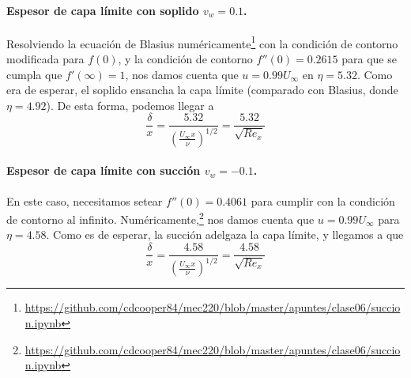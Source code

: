 \paragraph*{Espesor de capa límite con soplido $v_w=0.1$.}
Resolviendo la ecuación de Blasius numéricamente\footnote{\url{https://github.com/cdcooper84/mec220/blob/master/apuntes/clase06/succion.ipynb}} con la condición de contorno modificada para $f(0)$, y la condición de contorno $f''(0)=0.2615$ para que se cumpla que $f'(\infty)=1$, nos damos cuenta que $u=0.99U_\infty$ en $\eta=5.32$. 
Como era de esperar, el soplido ensancha la capa límite (comparado con Blasius, donde $\eta=4.92$). De esta forma, podemos llegar a 
%
\begin{equation}
\frac{\delta}{x}=\frac{5.32}{\left(\frac{U_\infty x}{\nu}\right)^{1/2}} = \frac{5.32}{\sqrt{Re_x}} 
\end{equation}

\paragraph*{Espesor de capa límite con succión $v_w=-0.1$.}
En este caso, necesitamos setear $f''(0) = 0.4061$ para cumplir con la condición de contorno al infinito.
Numéricamente,\footnote{\url{https://github.com/cdcooper84/mec220/blob/master/apuntes/clase06/succion.ipynb}} nos damos cuenta que $u=0.99U_\infty$ para $\eta=4.58$. Como es de esperar, la succión adelgaza la capa límite, y llegamos a que
%
\begin{equation}
\frac{\delta}{x}=\frac{4.58}{\left(\frac{U_\infty x}{\nu}\right)^{1/2}} = \frac{4.58}{\sqrt{Re_x}} 
\end{equation}
